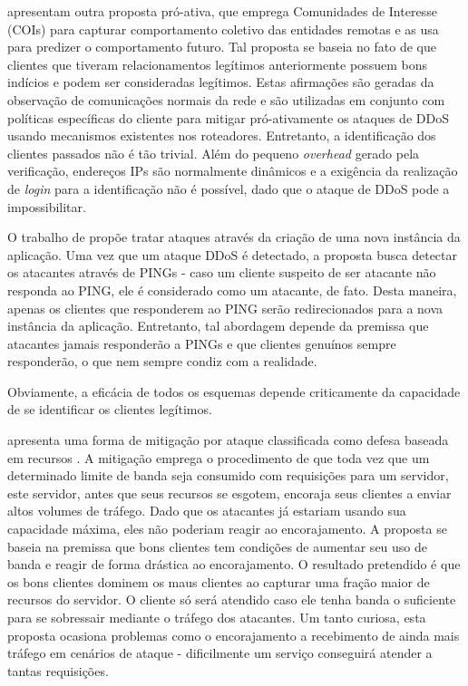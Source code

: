 \documentclass[a4paper, 12pt]{article}
\begin{document}
\cite{Verkaik:2006:PCD:1162666.1162673} apresentam outra proposta pró-ativa, que emprega Comunidades de Interesse (COIs) para capturar comportamento coletivo das entidades remotas e as usa para predizer o comportamento futuro. Tal proposta se baseia no fato de que clientes que tiveram relacionamentos legítimos anteriormente possuem bons indícios e podem ser consideradas legítimos. Estas afirmações são geradas da observação de comunicações normais da rede e são utilizadas em conjunto com políticas específicas do cliente para mitigar pró-ativamente os ataques de DDoS usando mecanismos existentes nos roteadores. 
%
Entretanto, a identificação dos clientes passados não é tão trivial. Além do pequeno \emph{overhead} gerado pela verificação, endereços IPs são normalmente dinâmicos e a exigência da realização de \emph{login} para a identificação não é possível, dado que o ataque de DDoS pode a impossibilitar.


O trabalho de \cite{Bakshi:10} propõe tratar ataques através da criação de uma nova instância da aplicação. Uma vez que um ataque DDoS é detectado, a proposta busca detectar os atacantes através de PINGs - caso um cliente suspeito de ser atacante não responda ao PING, ele é considerado como um atacante, de fato. Desta maneira, apenas os clientes que responderem ao PING serão 
redirecionados para a nova instância da aplicação. Entretanto, tal abordagem depende da premissa que atacantes jamais responderão a PINGs e que clientes genuínos sempre responderão, o que nem sempre condiz com a realidade.

Obviamente, a eficácia de todos os esquemas depende criticamente da capacidade de se identificar os clientes legítimos. 



\cite{Walfish:2010:DDO:1731060.1731063} apresenta uma forma de mitigação por ataque classificada como defesa baseada em recursos \cite{Dwork:1992:PVP:646757.705669}. A mitigação emprega o procedimento de que toda vez que um determinado limite de banda seja consumido com requisições para um servidor, este servidor, antes que seus recursos se esgotem, encoraja seus clientes a enviar altos volumes de tráfego. Dado que os atacantes já estariam usando sua capacidade máxima, eles não poderiam reagir ao encorajamento. A proposta se baseia na premissa que bons clientes tem condições de aumentar seu uso de banda e reagir de forma drástica ao encorajamento. O resultado pretendido é que os bons clientes dominem os maus clientes ao capturar uma fração maior de recursos do servidor. O cliente só será atendido caso ele tenha banda o suficiente para se sobressair mediante o tráfego dos atacantes. Um tanto curiosa, esta proposta ocasiona problemas como %
o encorajamento a recebimento de ainda mais tráfego em cenários de ataque - 
dificilmente um serviço conseguirá atender a tantas requisições. 
\end{document}
